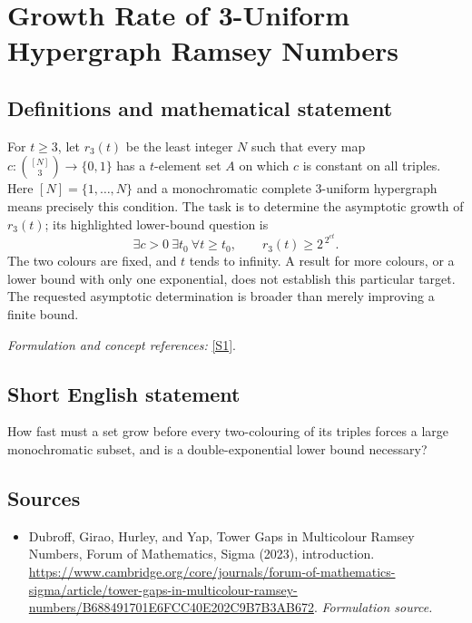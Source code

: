 \documentclass[11pt]{article}
\begin{document}
\section*{\texorpdfstring{Growth Rate of 3-Uniform Hypergraph Ramsey Numbers}{Growth Rate of 3-Uniform Hypergraph Ramsey Numbers}}\label{305}
\subsection{Definitions and mathematical statement}
For $t\ge3$, let $r_3(t)$ be the least integer $N$ such that every map $c:\binom{[N]}3\to\{0,1\}$ has a $t$-element set $A$ on which $c$ is constant on all triples. Here $[N]=\{1,\ldots,N\}$ and a monochromatic complete $3$-uniform hypergraph means precisely this condition. The task is to determine the asymptotic growth of $r_3(t)$; its highlighted lower-bound question is
\[
 \exists c>0\ \exists t_0\ \forall t\ge t_0,
 \qquad r_3(t)\ge 2^{\,2^{ct}}.
\]
The two colours are fixed, and $t$ tends to infinity. A result for more colours, or a lower bound with only one exponential, does not establish this particular target. The requested asymptotic determination is broader than merely improving a finite bound.
\par\smallskip\textit{Formulation and concept references:} \href{https://www.cambridge.org/core/journals/forum-of-mathematics-sigma/article/tower-gaps-in-multicolour-ramsey-numbers/B688491701E6FCC40E202C9B7B3AB672}{[S1]}.

\subsection{Short English statement}
How fast must a set grow before every two-colouring of its triples forces a large monochromatic subset, and is a double-exponential lower bound necessary?
\subsection{Sources}
\begin{itemize}
\item[S1]Dubroff, Girao, Hurley, and Yap, Tower Gaps in Multicolour Ramsey Numbers, Forum of Mathematics, Sigma (2023), introduction.
\url{https://www.cambridge.org/core/journals/forum-of-mathematics-sigma/article/tower-gaps-in-multicolour-ramsey-numbers/B688491701E6FCC40E202C9B7B3AB672}.
\textit{Formulation source.}
\end{itemize}
\end{document}
